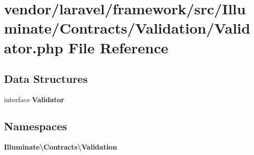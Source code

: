 \section{vendor/laravel/framework/src/\+Illuminate/\+Contracts/\+Validation/\+Validator.php File Reference}
\label{_contracts_2_validation_2_validator_8php}
\subsection*{Data Structures}
\begin{DoxyCompactItemize}
\item 
interface {\bf Validator}
\end{DoxyCompactItemize}
\subsection*{Namespaces}
\begin{DoxyCompactItemize}
\item 
 {\bf Illuminate\textbackslash{}\+Contracts\textbackslash{}\+Validation}
\end{DoxyCompactItemize}
